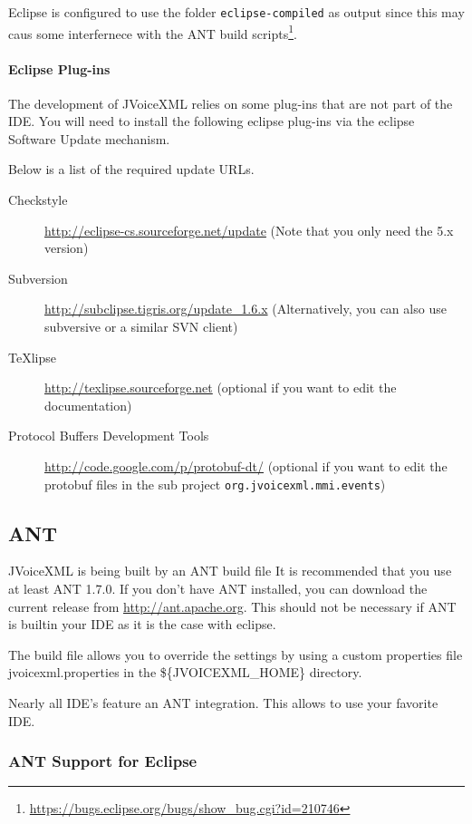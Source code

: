 \documentclass[11pt,a4paper]{article}
\begin{document}
Eclipse is configured to use the folder \texttt{eclipse-compiled} as output
since this may caus some interfernece with the ANT build
scripts\footnote{\url{https://bugs.eclipse.org/bugs/show_bug.cgi?id=210746}}.

\paragraph{Eclipse Plug-ins}

The development of JVoiceXML relies on some plug-ins that are not part of the
IDE. You will need to install the following eclipse plug-ins via the eclipse
Software Update mechanism.

Below is a list of the required update URLs.

\begin{description}
\item[Checkstyle] \url{http://eclipse-cs.sourceforge.net/update} (Note that you
only need the 5.x version)
\item[Subversion] \url{http://subclipse.tigris.org/update_1.6.x}
(Alternatively, you can also use subversive or a similar SVN client)
\item[TeXlipse] \url{http://texlipse.sourceforge.net} (optional if you want to
edit the documentation)
\item[Protocol Buffers Development Tools] \url{http://code.google.com/p/protobuf-dt/}
(optional if you want to edit the protobuf files in the sub project \texttt{org.jvoicexml.mmi.events})
\end{description}

\subsection{ANT}
\label{sec:ant}

JVoiceXML is being built by an ANT build file It is recommended that
you use at least ANT 1.7.0. 
If you don't have ANT installed, you can download the current release
from \url{http://ant.apache.org}. This should not be necessary if ANT is builtin
your IDE as it is the case with eclipse.

The build file allows you to override the settings by using a custom 
properties file jvoicexml.properties in the \$\{JVOICEXML\_HOME\}
directory.

Nearly all IDE's feature an ANT integration. This allows to use
your favorite IDE.

\subsubsection{ANT Support for Eclipse}
\label{sec:ant-eclipse}
\end{document}
